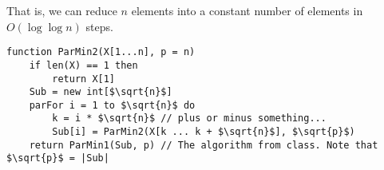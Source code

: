 \documentclass{article}
\begin{document}
That is, we can reduce $n$ elements into a constant number of elements in $O(\log \log n)$ steps.

\begin{lstlisting}
function ParMin2(X[1...n], p = n)
    if len(X) == 1 then
        return X[1]
    Sub = new int[$\sqrt{n}$]
    parFor i = 1 to $\sqrt{n}$ do
        k = i * $\sqrt{n}$ // plus or minus something...
        Sub[i] = ParMin2(X[k ... k + $\sqrt{n}$], $\sqrt{p}$)
    return ParMin1(Sub, p) // The algorithm from class. Note that $\sqrt{p}$ = |Sub|
\end{lstlisting}
\end{document}
